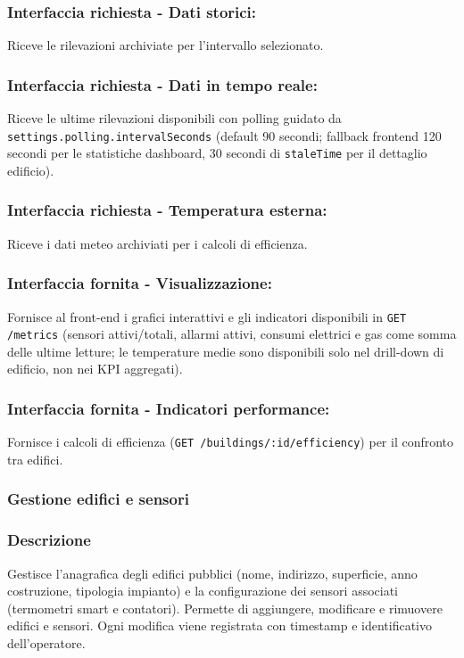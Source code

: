         \subsubsection*{Interfaccia richiesta - Dati storici:}
            Riceve le rilevazioni archiviate per l'intervallo selezionato.
        \subsubsection*{Interfaccia richiesta - Dati in tempo reale:}
            Riceve le ultime rilevazioni disponibili con polling guidato da \texttt{settings.polling.intervalSeconds} (default 90 secondi; fallback frontend 120 secondi per le statistiche dashboard, 30 secondi di \texttt{staleTime} per il dettaglio edificio).
        \subsubsection*{Interfaccia richiesta - Temperatura esterna:}
            Riceve i dati meteo archiviati per i calcoli di efficienza.
        \subsubsection*{Interfaccia fornita - Visualizzazione:}
            Fornisce al front-end i grafici interattivi e gli indicatori disponibili in \texttt{GET /metrics} (sensori attivi/totali, allarmi attivi, consumi elettrici e gas come somma delle ultime letture; le temperature medie sono disponibili solo nel drill-down di edificio, non nei KPI aggregati).
        \subsubsection*{Interfaccia fornita - Indicatori performance:}
            Fornisce i calcoli di efficienza (\texttt{GET /buildings/:id/efficiency}) per il confronto tra edifici.

    \subsubsection{Gestione edifici e sensori}
        \subsubsection*{Descrizione}
            Gestisce l'anagrafica degli edifici pubblici (nome, indirizzo, superficie, anno costruzione, tipologia impianto) e la configurazione dei sensori associati (termometri smart e contatori). Permette di aggiungere, modificare e rimuovere edifici e sensori. Ogni modifica viene registrata con timestamp e identificativo dell'operatore.

